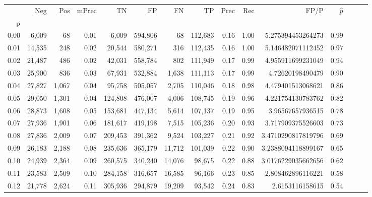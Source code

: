 \begin{tabular}{rrrrrrrrrrrrrrr}
\toprule
{} &     Neg &    Pos & mPrec &       TN &       FP &       FN &       TP &  Prec &   Rec &                   FP/P & $\hat{p}$ \\
p    &         &        &       &          &          &          &          &       &       &                        &           \\
\midrule
0.00 &   6,009 &     68 &  0.01 &    6,009 &  594,806 &       68 &  112,683 &  0.16 &  1.00 &      5.275394453264273 &      0.99 \\
0.01 &  14,535 &    248 &  0.02 &   20,544 &  580,271 &      316 &  112,435 &  0.16 &  1.00 &      5.146482071112452 &      0.97 \\
0.02 &  21,487 &    486 &  0.02 &   42,031 &  558,784 &      802 &  111,949 &  0.17 &  0.99 &      4.955911699231049 &      0.94 \\
0.03 &  25,900 &    836 &  0.03 &   67,931 &  532,884 &    1,638 &  111,113 &  0.17 &  0.99 &       4.72620198490479 &      0.90 \\
0.04 &  27,827 &  1,067 &  0.04 &   95,758 &  505,057 &    2,705 &  110,046 &  0.18 &  0.98 &      4.479401513068621 &      0.86 \\
0.05 &  29,050 &  1,301 &  0.04 &  124,808 &  476,007 &    4,006 &  108,745 &  0.19 &  0.96 &      4.221754130783762 &      0.82 \\
0.06 &  28,873 &  1,608 &  0.05 &  153,681 &  447,134 &    5,614 &  107,137 &  0.19 &  0.95 &       3.96567657936515 &      0.78 \\
0.07 &  27,936 &  1,901 &  0.06 &  181,617 &  419,198 &    7,515 &  105,236 &  0.20 &  0.93 &      3.717909375526603 &      0.73 \\
0.08 &  27,836 &  2,009 &  0.07 &  209,453 &  391,362 &    9,524 &  103,227 &  0.21 &  0.92 &     3.4710290817819796 &      0.69 \\
0.09 &  26,183 &  2,188 &  0.08 &  235,636 &  365,179 &   11,712 &  101,039 &  0.22 &  0.90 &     3.2388094118899167 &      0.65 \\
0.10 &  24,939 &  2,364 &  0.09 &  260,575 &  340,240 &   14,076 &   98,675 &  0.22 &  0.88 &     3.0176229035662656 &      0.62 \\
0.11 &  23,583 &  2,509 &  0.10 &  284,158 &  316,657 &   16,585 &   96,166 &  0.23 &  0.85 &      2.808462896116221 &      0.58 \\
0.12 &  21,778 &  2,624 &  0.11 &  305,936 &  294,879 &   19,209 &   93,542 &  0.24 &  0.83 &        2.6153116158615 &      0.54 \\

\end{tabular}
